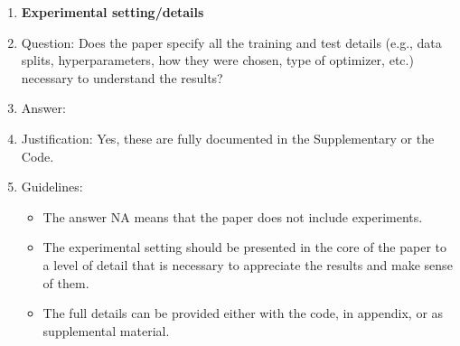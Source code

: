 \documentclass{article}
\theoremstyle{definition} \newtheorem{definition}{Definition}  \newtheorem{example}{Example}
\theoremstyle{remark} \newtheorem{remark}{Remark}
\begin{document}
\begin{enumerate}
\item {\bf Experimental setting/details}
    \item[] Question: Does the paper specify all the training and test details (e.g., data splits, hyperparameters, how they were chosen, type of optimizer, etc.) necessary to understand the results?
    \item[] Answer: \answerYes{} %
    \item[] Justification: Yes, these are fully documented in the Supplementary or the Code.
    \item[] Guidelines:
    \begin{itemize}
        \item The answer NA means that the paper does not include experiments.
        \item The experimental setting should be presented in the core of the paper to a level of detail that is necessary to appreciate the results and make sense of them.
        \item The full details can be provided either with the code, in appendix, or as supplemental material.
    \end{itemize}


\end{enumerate}
\end{document}
